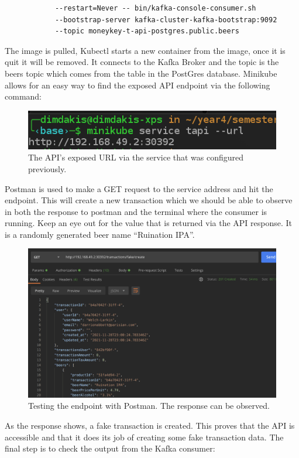 \begin{flushleft}
\begin{lstlisting}
            --restart=Never -- bin/kafka-console-consumer.sh 
            --bootstrap-server kafka-cluster-kafka-bootstrap:9092 
            --topic moneykey-t-api-postgres.public.beers
    \end{lstlisting}
    The image is pulled, Kubectl starts a new container from the image, once it is quit it will be removed. It connects to the Kafka Broker and the topic is the beers
    topic which comes from the  table in the PostGres database.
    \bigbreak
    Minikube allows for an easy way to find the exposed API endpoint via the following command:
    \begin{figure} [ht]
        \begin{center}
            \includegraphics[width=.6\textwidth]{figures/minikube-service-url.png}
            \caption{The API's exposed URL via the service that was configured previously.}
            \label{fig: 2.16}
        \end{center}
    \end{figure}
    \bigbreak
    Postman is used to make a GET request to the service address and hit the  endpoint. This will create a new transaction which we should
    be able to observe in both the response to postman and the terminal where the consumer is running. \newline
    Keep an eye out for the  value that is returned via the API response. It is a randomly generated beer name ``Ruination IPA''.
    \begin{figure} [ht]
        \begin{center}
            \includegraphics[width=1\textwidth]{figures/postman.png}
            \caption{Testing the endpoint with Postman. The response can be observed.}
            \label{fig: 2.17}
        \end{center}
    \end{figure}
    \pagebreak
    \newline As the response shows, a fake transaction is created. This proves that the API is accessible and that it does its job of creating some fake transaction data.\newline
    The final step is to check the output from the Kafka consumer:


\end{flushleft}
